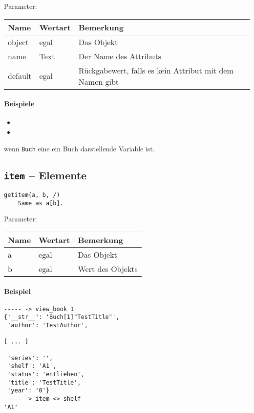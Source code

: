 Parameter:

\begin{tabular}{|p{}|p{}|p{}|}
Name & Wertart & Bemerkung\\
\hline
object & egal & Das Objekt \\
name & Text & Der Name des Attributs \\
default & egal & Rückgabewert, falls es kein Attribut mit dem Namen gibt
\end{tabular}

\paragraph{Beispiele}
\begin{itemize}
\item {}
\item {}
\end{itemize}
wenn \texttt{Buch} eine ein Buch darstellende Variable ist.

\subsection{\texttt{item} -- Elemente}
\label{subsec:command_list:item}

\begin{verbatim}
getitem(a, b, /)
    Same as a[b].
\end{verbatim}

Parameter:

\begin{tabular}{|p{}|p{}|p{}|}
Name & Wertart & Bemerkung\\
\hline
a & egal & Das Objekt \\
b & egal & Wert des Objekts \\
\end{tabular}

\paragraph{Beispiel}

\begin{verbatim}
----- -> view_book 1
{'__str__': 'Buch[1]"TestTitle"',
 'author': 'TestAuthor',

[ ... ]

 'series': '',
 'shelf': 'A1',
 'status': 'entliehen',
 'title': 'TestTitle',
 'year': '0'}
----- -> item <> shelf
'A1'
\end{verbatim}

